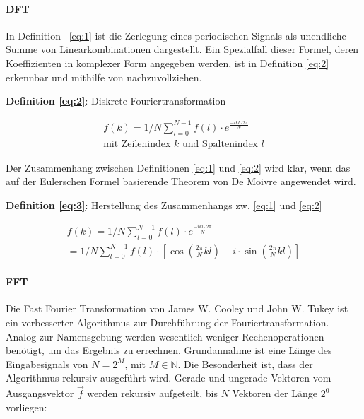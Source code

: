 \paragraph{DFT}
In Definition ~\eqref{eq:1} ist die Zerlegung eines periodischen Signals als unendliche Summe von Linearkombinationen dargestellt. Ein Spezialfall dieser Formel, deren Koeffizienten in komplexer Form angegeben werden, ist in Definition \eqref{eq:2} erkennbar und mithilfe von \cite{arenz_fourier} nachzuvollziehen.

\begin{flushleft}
	\textbf{Definition \eqref{eq:2}}: Diskrete Fouriertransformation
\end{flushleft}
\vspace{\baselineskip}
\begin{equation}
	\begin{gathered}
		f(k) = 1/N \sum_{l=0}^{N-1}f(l) \cdot e^{\frac{-ikl\cdot 2\pi}{N}} \\
		\text{mit Zeilenindex } k \text{ und Spaltenindex } l
	\end{gathered}\label{eq:2}
\end{equation}

Der Zusammenhang zwischen Definitionen \eqref{eq:1} und \eqref{eq:2} wird klar, wenn das auf der Eulerschen Formel basierende Theorem von De Moivre \cite{de_moivre} angewendet wird.
\newpage
\begin{flushleft}
	\textbf{Definition \eqref{eq:3}}: Herstellung des Zusammenhangs zw. \eqref{eq:1} und \eqref{eq:2}
\end{flushleft}
\vspace{\baselineskip}
\begin{equation}
	\begin{gathered}
		f(k) = 1/N \sum_{l=0}^{N-1}f(l) \cdot e^{\frac{-ikl\cdot 2\pi}{N}} \\
		=  1/N \sum_{l=0}^{N-1}f(l) \cdot \left[ \cos(\frac{2\pi}{N}kl) - i \cdot \sin(\frac{2\pi}{N}kl)\right] 
	\end{gathered}\label{eq:3}
\end{equation}

\paragraph{FFT}
Die Fast Fourier Transformation von James W. Cooley und John W. Tukey ist ein verbesserter Algorithmus zur Durchführung der Fouriertransformation. Analog zur Namensgebung werden wesentlich weniger Rechenoperationen benötigt, um das Ergebnis zu errechnen. Grundannahme ist eine Länge des Eingabesignals von $N = 2^{M}$, mit $M\in\mathbb{N}$.
Die Besonderheit ist, dass der Algorithmus rekursiv ausgeführt wird.
Gerade und ungerade Vektoren vom Ausgangsvektor $\vec{f}$ werden rekursiv aufgeteilt, bis $N$ Vektoren der Länge $2^{0}$ vorliegen:

